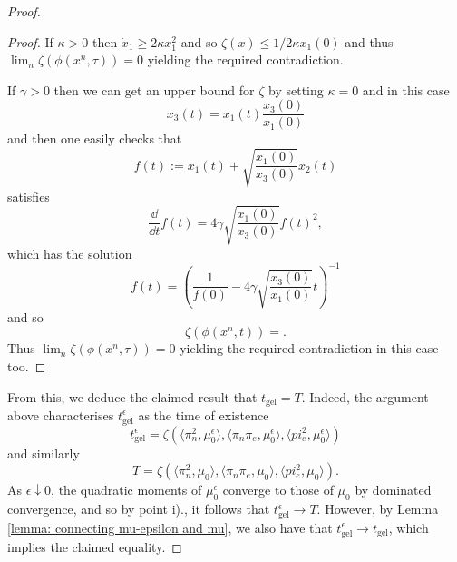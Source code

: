 \begin{proof}
\begin{proof}
If $\kappa > 0$ then $\dot x_1 \geq 2\kappa x_1^2$ and so $\zeta(x) \leq 1 / 2\kappa x_1(0)$ and thus $\lim_n \zeta\left(\phi(x^n,\tau)\right) = 0$ yielding the required contradiction.

If $\gamma > 0$ then we can get an upper bound for $\zeta$ by setting $\kappa = 0$ and in this case
\begin{equation}\label{eq:proportional}
    x_3(t) = x_1(t)
    \frac{x_3(0)}{x_1(0)}
\end{equation}
and then one easily checks that
\begin{equation}
    f(t) := x_1(t)
           + \sqrt{\frac{x_1(0)}{x_3(0)}} x_2(t)
\end{equation}
satisfies
\begin{equation*}
    \frac{\dd }{\dd t}f(t) = 4\gamma 
    \sqrt{\frac{x_1(0)}{x_3(0)}}f(t)^2,
\end{equation*}
which has the solution
\begin{equation}\label{eq:quadmoment-ode}
    f(t) = \left(\frac{1}{f(0)} - 4\gamma 
    \sqrt{\frac{x_3(0)}{x_1(0)}}t \right)^{-1}
\end{equation}
and so
\begin{equation*}
    \zeta\left(\phi\left(x^n,t\right)\right)
    =
    .
\end{equation*}
Thus $\lim_n \zeta\left(\phi(x^n,\tau)\right) = 0$ yielding the required contradiction in this case too.

\end{proof}

From this, we deduce the claimed result that $t_\mathrm{gel}=T$. Indeed, the argument above characterises $t_\mathrm{gel}^\epsilon$ as the time of existence \begin{equation}
    t_\mathrm{gel}^\epsilon=\zeta(\langle \pi_n^2, \mu^\epsilon_0\rangle, \langle \pi_n \pi_e, \mu^\epsilon_0\rangle, \langle pi_e^2, \mu_0^\epsilon\rangle)
\end{equation} and similarly \begin{equation}  T=\zeta(\langle \pi_n^2, \mu_0\rangle, \langle \pi_n \pi_e, \mu_0\rangle, \langle pi_e^2, \mu_0\rangle). \end{equation} As $\epsilon \downarrow 0$, the quadratic moments of $\mu^\epsilon_0$ converge to those of $\mu_0$ by dominated convergence, and so by point i)., it follows that $t^\epsilon_\mathrm{gel}\rightarrow T$. However, by Lemma \ref{lemma: connecting mu-epsilon and mu}, we also have that $t_\mathrm{gel}^\epsilon\rightarrow t_\mathrm{gel}$, which implies the claimed equality.


\end{proof}
